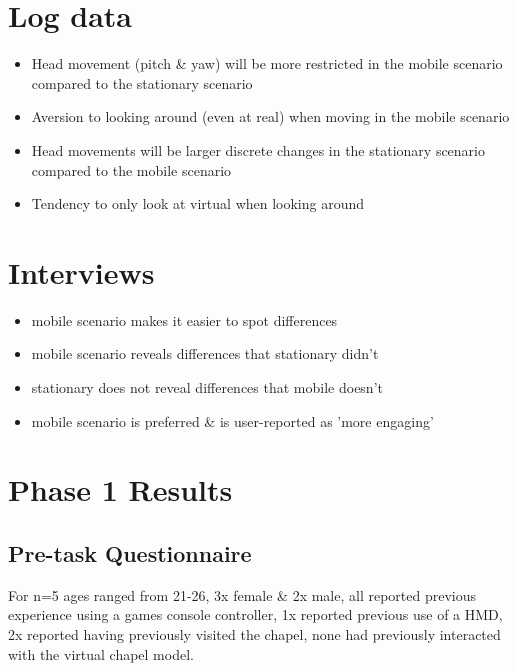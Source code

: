 \section{Log data}
\begin{itemize}
	\item Head movement (pitch \& yaw) will be more restricted in the mobile scenario compared to the stationary scenario
	\item Aversion to looking around (even at real) when moving in the mobile scenario
	\item Head movements will be larger discrete changes in the stationary scenario compared to the mobile scenario
	\item Tendency to only look at virtual when looking around
\end{itemize}

\section{Interviews}
\begin{itemize}
	\item mobile scenario makes it easier to spot differences
	\item mobile scenario reveals differences that stationary didn't
	\item stationary does not reveal differences that mobile doesn't
	\item mobile scenario is preferred \& is user-reported as 'more engaging'
\end{itemize}


\section{Phase 1 Results}

\subsection{Pre-task Questionnaire}

For n=5 ages ranged from 21-26, 3x female \& 2x male, all reported previous experience using a games console controller, 1x reported previous use of a HMD, 2x reported having previously visited the chapel, none had previously interacted with the virtual chapel model.


